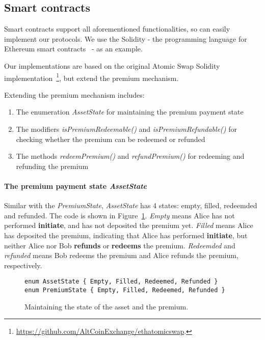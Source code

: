 \subsection{Smart contracts}

Smart contracts support all aforementioned functionalities, so can easily implement our protocols.
We use the Solidity - the programming language for Ethereum smart contracts~\cite{wood2014ethereum} - as an example.

Our implementations are based on the original Atomic Swap Solidity implementation~\footnote{\url{https://github.com/AltCoinExchange/ethatomicswap}.},
but extend the premium mechanism.

Extending the premium mechanism includes:

\begin{enumerate}
    \item The enumeration \textit{AssetState} for maintaining the premium payment state
    \item The modifiers \textit{isPremiumRedeemable()} and \textit{isPremiumRefundable()} for checking whether the premium can be redeemed or refunded
    \item The methods \textit{redeemPremium()} and \textit{refundPremium()} for redeeming and refunding the premium
\end{enumerate}

\paragraph{The premium payment state \textit{AssetState}}

Similar with the \textit{PremiumState}, \textit{AssetState} has 4 states: empty, filled, redeemded and refunded.
The code is shown in Figure~\ref{code:state}.
\textit{Empty} means Alice has not performed \textbf{initiate}, and has not deposited the premium yet.
\textit{Filled} means Alice has deposited the premium, indicating that Alice has performed \textbf{initiate}, but neither Alice nor Bob \textbf{refunds} or \textbf{redeems} the premium.
\textit{Redeemded} and \textit{refunded} means Bob redeems the premium and Alice refunds the premium, respectively.

\begin{figure}
\begin{lstlisting}[language=Solidity, basicstyle=\tiny]
enum AssetState { Empty, Filled, Redeemed, Refunded }
enum PremiumState { Empty, Filled, Redeemed, Refunded }
\end{lstlisting}
\label{code:state}
\caption{Maintaining the state of the asset and the premium.}
\end{figure}

